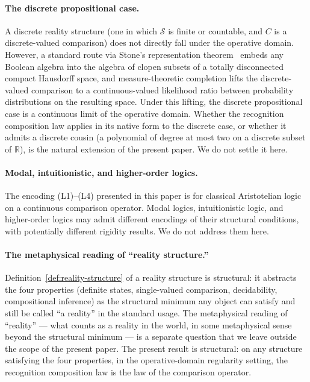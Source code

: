 \documentclass[11pt,a4paper]{article}
\theoremstyle{definition}
\theoremstyle{remark}
\begin{document}
\paragraph{The discrete propositional case.} A discrete reality
structure (one in which $\mathcal{S}$ is finite or countable, and $C$
is a discrete-valued comparison) does not directly fall under the
operative domain. However, a standard route via Stone's representation
theorem~\cite{Stone1936} embeds any Boolean algebra into the algebra
of clopen subsets of a totally disconnected compact Hausdorff space,
and measure-theoretic completion lifts the discrete-valued comparison
to a continuous-valued likelihood ratio between probability
distributions on the resulting space. Under this lifting, the discrete
propositional case is a continuous limit of the operative domain.
Whether the recognition composition law applies in its native form to
the discrete case, or whether it admits a discrete cousin (a
polynomial of degree at most two on a discrete subset of
$\mathbb{R}$), is the natural extension of the present paper. We do
not settle it here.

\paragraph{Modal, intuitionistic, and higher-order logics.} The
encoding (L1)--(L4) presented in this paper is for classical
Aristotelian logic on a continuous comparison operator. Modal logics,
intuitionistic logic, and higher-order logics may admit different
encodings of their structural conditions, with potentially different
rigidity results. We do not address them here.

\paragraph{The metaphysical reading of ``reality structure.''}
Definition~\ref{def:reality-structure} of a reality structure is
structural: it abstracts the four properties (definite states,
single-valued comparison, decidability, compositional inference) as
the structural minimum any object can satisfy and still be called ``a
reality'' in the standard usage. The metaphysical reading of
``reality'' --- what counts as a reality in the world, in some
metaphysical sense beyond the structural minimum --- is a separate
question that we leave outside the scope of the present paper. The
present result is structural: on any structure satisfying the four
properties, in the operative-domain regularity setting, the
recognition composition law is the law of the comparison operator.
\end{document}
